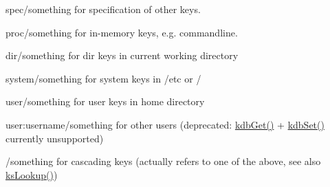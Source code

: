 \begin{DoxyItemize}
\item {\ttfamily spec/something} for specification of other keys.
\item {\ttfamily proc/something} for in-\/memory keys, e.\+g. commandline.
\item {\ttfamily dir/something} for dir keys in current working directory
\item {\ttfamily system/something} for system keys in /etc or /
\item {\ttfamily user/something} for user keys in home directory
\item {\ttfamily user\+:username/something} for other users (deprecated\+: \mbox{\hyperlink{group__kdb_ga28e385fd9cb7ccfe0b2f1ed2f62453a1}{kdb\+Get()}} + \mbox{\hyperlink{group__kdb_ga11436b058408f83d303ca5e996832bcf}{kdb\+Set()}} currently unsupported)
\item {\ttfamily /something} for cascading keys (actually refers to one of the above, see also \mbox{\hyperlink{group__keyset_gaa34fc43a081e6b01e4120daa6c112004}{ks\+Lookup()}})


\end{DoxyItemize}
